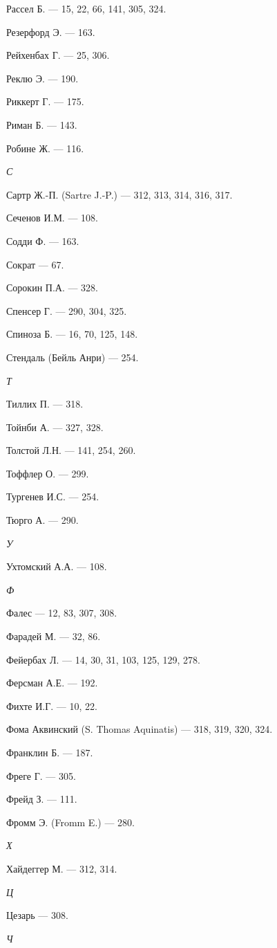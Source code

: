 \documentclass[a4paper,14pt,russian]{extreport}
\begin{document}
Рассел Б. --- 15, 22, 66, 141, 305, 324.

Резерфорд Э. --- 163.

Рейхенбах Г. --- 25, 306.

Реклю Э. --- 190.

Риккерт Г. --- 175.

Риман Б. --- 143.

Робине Ж. --- 116.

\emph{С}

Сартр Ж.-П. (Sartre J.-P.) --- 312, 313, 314, 316, 317.

Сеченов И.М. --- 108.

Содди Ф. --- 163.

Сократ --- 67.

Сорокин П.А. --- 328.

Спенсер Г. --- 290, 304, 325.

Спиноза Б. --- 16, 70, 125, 148.

Стендаль (Бейль Анри) --- 254.

\emph{Т}

Тиллих П. --- 318.

Тойнби А. --- 327, 328.

Толстой Л.Н. --- 141, 254, 260.

Тоффлер О. --- 299.

Тургенев И.С. --- 254.

Тюрго А. --- 290.

\emph{У}

Ухтомский А.А. --- 108.

\emph{Ф}

Фалес --- 12, 83, 307, 308.

Фарадей М. --- 32, 86.

Фейербах Л. --- 14, 30, 31, 103, 125, 129, 278.

Ферсман А.Е. --- 192.

Фихте И.Г. --- 10, 22.

Фома Аквинский (S. Thomas Aquinatis) --- 318, 319, 320, 324.

Франклин Б. --- 187.

Фреге Г. --- 305.

Фрейд З. --- 111.

Фромм Э. (Fromm E.) --- 280.

\emph{Х}

Хайдеггер М. --- 312, 314.

\emph{Ц}

Цезарь --- 308.

\emph{Ч}
\end{document}
